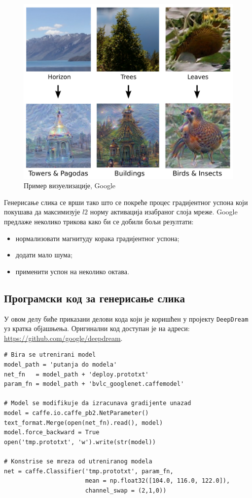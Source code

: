 \documentclass[a4paper]{article}
\begin{document}
\begin{figure}[h!]
\begin{center}
    \includegraphics[width=\textwidth]{./resources/deepdream4.png}
\end{center}
\caption{Пример визуелизације, Google}
\label{fig:deepdream4}
\end{figure}

Генерисање слика се врши тако што се покреће процес градијентног успона
који покушава да максимизује $l2$ норму активација изабраног слоја мреже.
Google предлаже неколико трикова како би се добили бољи резултати:
\begin{itemize}
    \item нормализовати магнитуду корака градијентног успона;
    \item додати мало шума;
    \item применити успон на неколико октава.
\end{itemize}

\subsection{Програмски код за генерисање слика}
\label{subsec:generatingImages}
У овом делу биће приказани делови кода који је коришћен у пројекту \texttt{DeepDream} уз кратка објашњења.
Оригинални код доступан је на адреси: \\
\url{https://github.com/google/deepdream}.

\begin{verbatim}
# Bira se utrenirani model
model_path = 'putanja do modela'
net_fn   = model_path + 'deploy.prototxt'
param_fn = model_path + 'bvlc_googlenet.caffemodel'

# Model se modifikuje da izracunava gradijente unazad
model = caffe.io.caffe_pb2.NetParameter()
text_format.Merge(open(net_fn).read(), model)
model.force_backward = True
open('tmp.prototxt', 'w').write(str(model))

# Konstrise se mreza od utreniranog modela
net = caffe.Classifier('tmp.prototxt', param_fn,
                       mean = np.float32([104.0, 116.0, 122.0]),
                       channel_swap = (2,1,0))
\end{verbatim}
\end{document}
